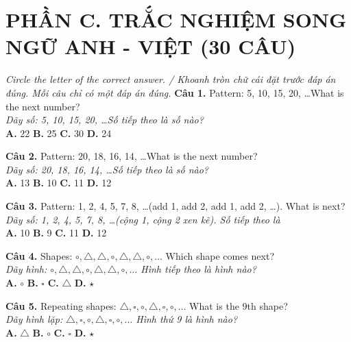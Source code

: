 \documentclass[11pt,a4paper]{article}
\begin{document}
\newpage
\section*{PHẦN C. TRẮC NGHIỆM SONG NGỮ ANH - VIỆT (30 CÂU)}
\textit{Circle the letter of the correct answer. / Khoanh tròn chữ cái đặt trước đáp án đúng. Mỗi câu chỉ có một đáp án đúng.}
\textbf{Câu 1.} Pattern: 5, 10, 15, 20, \ldots What is the next number?\\
\textit{Dãy số: 5, 10, 15, 20, \ldots Số tiếp theo là số nào?}\\
\textbf{A.} 22 \quad \textbf{B.} 25 \quad \textbf{C.} 30 \quad \textbf{D.} 24\par\vspace{1.2mm}

\textbf{Câu 2.} Pattern: 20, 18, 16, 14, \ldots What is the next number?\\
\textit{Dãy số: 20, 18, 16, 14, \ldots Số tiếp theo là số nào?}\\
\textbf{A.} 13 \quad \textbf{B.} 10 \quad \textbf{C.} 11 \quad \textbf{D.} 12\par\vspace{1.2mm}

\textbf{Câu 3.} Pattern: 1, 2, 4, 5, 7, 8, \ldots (add 1, add 2, add 1, add 2, \ldots). What is next?\\
\textit{Dãy số: 1, 2, 4, 5, 7, 8, \ldots (cộng 1, cộng 2 xen kẽ). Số tiếp theo là}\\
\textbf{A.} 10 \quad \textbf{B.} 9 \quad \textbf{C.} 11 \quad \textbf{D.} 12\par\vspace{1.2mm}

\textbf{Câu 4.} Shapes: $\circ,\triangle,\triangle,\circ,\triangle,\triangle,\circ,\ldots$ Which shape comes next?\\
\textit{Dãy hình: $\circ,\triangle,\triangle,\circ,\triangle,\triangle,\circ,\ldots$ Hình tiếp theo là hình nào?}\\
\textbf{A.} $\circ$ \quad \textbf{B.} $\square$ \quad \textbf{C.} $\triangle$ \quad \textbf{D.} $\star$\par\vspace{1.2mm}

\textbf{Câu 5.} Repeating shapes: $\triangle,\square,\circ,\triangle,\square,\circ,\ldots$ What is the 9th shape?\\
\textit{Dãy hình lặp: $\triangle,\square,\circ,\triangle,\square,\circ,\ldots$ Hình thứ 9 là hình nào?}\\
\textbf{A.} $\triangle$ \quad \textbf{B.} $\circ$ \quad \textbf{C.} $\square$ \quad \textbf{D.} $\star$\par\vspace{1.2mm}
\end{document}
